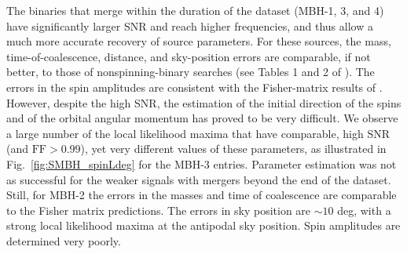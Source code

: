 \documentclass{iopart}
\begin{document}
The binaries that merge within the duration of the dataset (MBH-1, 3, and 4) have significantly larger SNR and reach higher frequencies, and thus allow a much more accurate recovery of source parameters. For these sources, the mass, time-of-coalescence, distance, and sky-position errors are comparable, if not better, to those of nonspinning-binary searches (see Tables 1 and 2 of \cite{mldcamaldi2}). The errors in the spin amplitudes are consistent with the Fisher-matrix results of \cite{SpinBBHLangHughes}.
However, despite the high SNR, the estimation of the initial direction of the spins and of the orbital angular momentum has proved to be very difficult. We observe a large number of the local likelihood maxima that have comparable, high SNR (and $\mathrm{FF} > 0.99$), yet very different values of these parameters, as illustrated in Fig.\ \ref{fig:SMBH_spinLdeg} for the MBH-3 entries. Parameter estimation was not as successful for the weaker signals with mergers beyond the end of the dataset. Still, for MBH-2 the errors in the masses and time of coalescence are comparable to the Fisher matrix predictions. The errors in sky position are $\sim 10$ deg, with a strong local likelihood maxima at the antipodal sky position. Spin amplitudes are determined very poorly.
%
\end{document}
